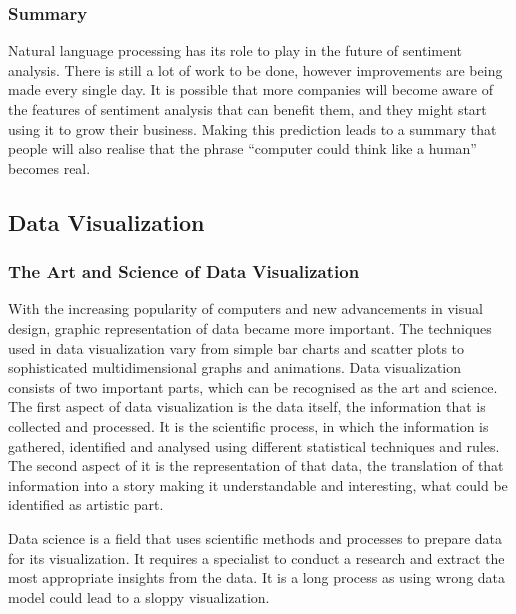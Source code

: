 \documentclass{article}
\begin{document}
\subsubsection{Summary}
{\large
Natural language processing has its role to play in the future of sentiment analysis. There is still a lot of work to be done, however improvements are being made every single day. It is possible that more companies will become aware of the features of sentiment analysis that can benefit them, and they might start using it to grow their business. Making this prediction leads to a summary that people will also realise that the phrase ``computer could think like a human'' becomes real.\par
}

\subsection{Data Visualization}
\subsubsection{The Art and Science of Data Visualization}

{\large
With the increasing popularity of computers and new advancements in visual design, graphic representation of data became more important. The techniques used in data visualization vary from simple bar charts and scatter plots to sophisticated multidimensional graphs and animations. Data visualization consists of two important parts, which can be recognised as the art and science. The first aspect of data visualization is the data itself, the information that is collected and processed. It is the scientific process, in which the information is gathered, identified and analysed using different statistical techniques and rules. The second aspect of it is the representation of that data, the translation of that information into a story making it understandable and interesting, what could be identified as artistic part.\par
}

{\large
Data science is a field that uses scientific methods and processes to prepare data for its visualization. It requires a specialist to conduct a research and extract the most appropriate insights from the data. It is a long process as using wrong data model could lead to a sloppy visualization.\par
}
\end{document}
